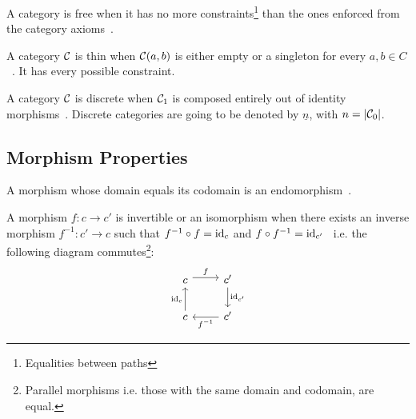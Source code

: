 \begin{definition}
  A category is free when it has no more constraints\footnote{Equalities
  between paths} than the ones enforced from the category axioms~\parencite{adamek_herrlich_strecker:joy_cats}.
\end{definition}

\begin{definition}
  A category $\mathcal{C}$ is thin when $\mathcal{C}(a, b)$ is either empty or a singleton for
  every $a,b\in C$~\parencite{adamek_herrlich_strecker:joy_cats}. It has every
  possible constraint.
\end{definition}

\begin{definition}
  A category $\mathcal{C}$ is discrete when $\mathcal{C}_1$ is composed entirely out of identity
  morphisms~\parencite{awodey:category_theory}. Discrete categories are going to
  be denoted by $\underline{n}$, with $n=|\mathcal{C}_0|$.
\end{definition}

\subsection{Morphism Properties}

\begin{definition}
  A morphism whose domain equals its codomain is an
  endomorphism~\parencite{riehl:category_theory_in_context}.
\end{definition}

\begin{definition}
  A morphism $f: c\to c'$ is invertible or an isomorphism when there exists an
  inverse morphism $f^{-1}:c'\to c$ such that $f^{-1}\circ f = \mathrm{id}_{c}$ and
  $f\circ f^{-1} = \mathrm{id}_{c'}$~\parencite{lane:working_mathematician} i.e. the
  following diagram commutes\footnote{Parallel morphisms i.e. those with the
  same domain and codomain, are equal.}:
  \[\begin{tikzcd}
    c & {c'} \\
    c & {c'}
    \arrow["f", shift left=1, from=1-1, to=1-2]
    \arrow["{f^{-1}}", from=2-2, to=2-1]
    \arrow["{\mathrm{id}_c}", from=2-1, to=1-1]
    \arrow["{\mathrm{id}_{c'}}", from=1-2, to=2-2]
  \end{tikzcd}\]
\end{definition}

